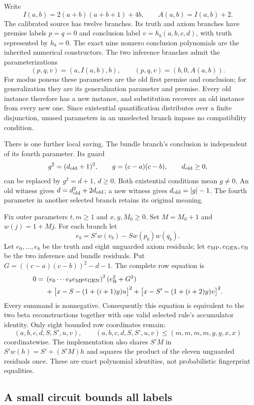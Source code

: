 Write
\[
 I(a,b)=2(a+b)(a+b+1)+4b,\qquad A(a,b)=I(a,b)+2.
\]
The calibrated source has twelve branches.  Its truth and axiom branches
have premise labels $p=q=0$ and conclusion label
$v=h_b(a,b,c,d)$, with truth represented by $h_b=0$.
The exact nine nonzero conclusion polynomials are the inherited numerical
constructors.  The two inference branches admit the parameterizations
\[
 (p,q,v)=(a,I(a,b),b),\qquad
 (p,q,v)=(b,0,A(a,b)).
\]
For modus ponens these parameters are the old first premise and conclusion;
for generalization they are its generalization parameter and premise.
Every old instance therefore has a new instance, and substitution recovers
an old instance from every new one.  Since existential quantification
distributes over a finite disjunction, unused parameters in an unselected
branch impose no compatibility condition.

There is one further local saving.  The bundle branch's conclusion is
independent of its fourth parameter.  Its guard
\[
 g^2=(d_{\rm old}+1)^2,
 \qquad g=(c-a)(c-b),\qquad d_{\rm old}\ge0,
\]
can be replaced by $g^2=d+1$, $d\ge0$.  Both existential conditions mean
$g\ne0$.  An old witness gives $d=d_{\rm old}^2+2d_{\rm old}$; a new
witness gives $d_{\rm old}=|g|-1$.  The fourth parameter in another
selected branch retains its original meaning.

Fix outer parameters $t,m\ge1$ and $x,y,M_0\ge0$.  Set $M=M_0+1$ and
$w(j)=1+Mj$.  For each branch let
\[
 e_b=S' w(v_b)-S w(p_b)w(q_b).
\]
Let $e_0,\ldots,e_8$ be the truth and eight unguarded axiom residuals;
let $e_{\rm MP},e_{\rm GEN},e_{\rm B}$ be the two inference and bundle
residuals.  Put $G=((c-a)(c-b))^2-d-1$.  The complete row equation is
\begin{align*}
0={}&\left(e_0\cdots e_8e_{\rm MP}e_{\rm GEN}\right)^2
                   (e_{\rm B}^2+G^2)\\
 &+\bigl[x-S-(1+(i+1)y)u\bigr]^2
  +\bigl[x-S'-(1+(i+2)y)v\bigr]^2.
\end{align*}
Every summand is nonnegative.  Consequently this equation is equivalent
to the two beta reconstructions together with one valid selected rule's
accumulator identity.  Only eight bounded row coordinates remain:
\[
 (a,b,c,d,S,S',u,v),\qquad
 (a,b,c,d,S,S',u,v)\le(m,m,m,m,y,y,x,x)
\]
coordinatewise.  The implementation also shares $S'M$ in
$S'w(h)=S'+(S'M)h$ and squares the product of the eleven unguarded
residuals once.  These are exact polynomial identities, not probabilistic
fingerprint equalities.

\subsection{A small circuit bounds all labels}

